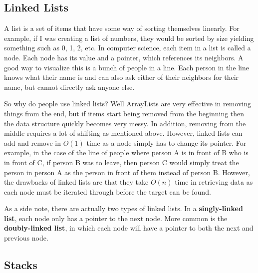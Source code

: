 \subsection{Linked Lists}

A list is a set of items that have some way of sorting themselves linearly. For example, if I was creating a list of numbers, they would be sorted by size yielding something such as 0, 1, 2, etc. In computer science, each item in a list is called a node. Each node has its value and a pointer, which references its neighbors. A good way to visualize this is a bunch of people in a line. Each person in the line knows what their name is and can also ask either of their neighbors for their name, but cannot directly ask anyone else.

So why do people use linked lists? Well ArrayLists are very effective in removing things from the end, but if items start being removed from the beginning then the data structure quickly becomes very messy. In addition, removing from the middle requires a lot of shifting as mentioned above. However, linked lists can add and remove in $O(1)$ time as a node simply has to change its pointer. For example, in the case of the line of people where person A is in front of B who is in front of C, if person B was to leave, then person C would simply treat the person in person A as the person in front of them instead of person B. However, the drawbacks of linked lists are that they take $O(n)$ time in retrieving data as each node must be iterated through before the target can be found. 


As a side note, there are actually two types of linked lists. In a \textbf{singly-linked list}, each node only has a pointer to the next node. More common is the \textbf{doubly-linked list}, in which each node will have a pointer to both the next and previous node.


\subsection{Stacks}

